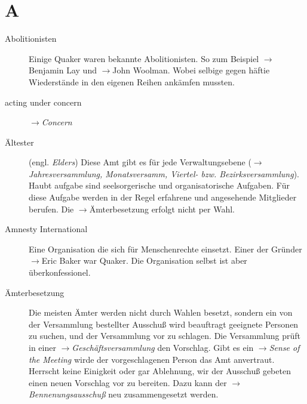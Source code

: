 \section*{A}

\articlesize
\begin{description}

 \item[Abolitionisten] Einige Quaker waren bekannte Abolitionisten. So zum
Beispiel $\to$Benjamin Lay und $\to$John Woolman. Wobei selbige gegen häftie
Wiederstände in den eigenen Reihen ankämfen mussten.

 \item[acting under concern] $\to$\textit{Concern}

 \item[Ältester] (engl. \textit{Elders}) Diese Amt gibt es für jede Verwaltungsebene
($\to$\textit{Jahresversammlung, Monatsversamm, Viertel- bzw.
Bezirksversammlung}). Haubt aufgabe sind seelsorgerische und organisatorische
Aufgaben. Für diese Aufgabe werden in der Regel erfahrene und angesehende
Mitglieder berufen. Die $\to$Ämterbesetzung erfolgt nicht per Wahl.

 \item[Amnesty International] Eine Organisation die sich für Menschenrechte
einsetzt. Einer der Gründer $\to$Eric Baker war Quaker. Die Organisation selbst
ist aber überkonfessionel.

 \item[Ämterbesetzung]  Die meisten Ämter werden nicht durch Wahlen besetzt,
sondern ein von der Versammlung bestellter Ausschuß wird beauftragt geeignete
Personen zu suchen, und der Versammlung vor zu schlagen. Die Versammlung prüft
in einer $\to$\textit{Geschäftsversammlung} den Vorschlag. Gibt es ein
$\to$\textit{Sense of the Meeting} wirde der vorgeschlagenen Person das Amt
anvertraut. Herrscht keine Einigkeit oder gar Ablehnung, wir der Ausschuß
gebeten einen neuen Vorschlag vor zu bereiten. Dazu kann der
$\to$\textit{Bennenungsausschuß} neu zusammengesetzt werden.


\end{description}
